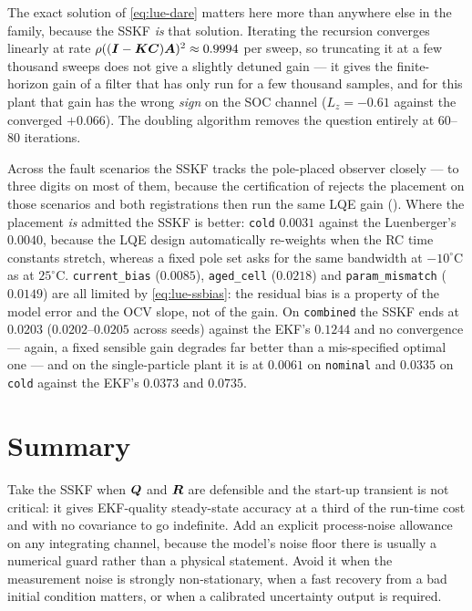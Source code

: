 The exact solution of \eqref{eq:lue-dare} matters here more than anywhere else in the family,
because the SSKF \emph{is} that solution.  Iterating the recursion converges linearly at rate
$\rho((\bm{I}-\bm{K}\bm{C})\bm{A})^2 \approx 0.9994$ per sweep, so truncating it at a few thousand sweeps does
not give a slightly detuned gain --- it gives the finite-horizon gain of a filter that has only
run for a few thousand samples, and for this plant that gain has the wrong \emph{sign} on the SOC
channel ($L_z=-0.61$ against the converged $+0.066$).  The doubling algorithm removes the question
entirely at $60$--$80$ iterations.

Across the fault scenarios the SSKF tracks the pole-placed observer closely --- to three digits
on most of them, because the certification of  rejects the placement on
those scenarios and both registrations then run the same LQE gain ().  Where
the placement \emph{is} admitted the SSKF is better: \texttt{cold} $0.0031$ against the
Luenberger's $0.0040$, because the LQE design automatically re-weights when the RC time constants
stretch, whereas a fixed pole set asks for the same bandwidth at $-10^\circ$C as at
$25^\circ$C.  \texttt{current\_bias} ($0.0085$), \texttt{aged\_cell} ($0.0218$) and
\texttt{param\_mismatch} ($0.0149$) are all limited by \eqref{eq:lue-ssbias}: the residual bias
is a property of the model error and the OCV slope, not of the gain.  On \texttt{combined} the
SSKF ends at $0.0203$ ($0.0202$--$0.0205$ across seeds) against the EKF's $0.1244$ and no
convergence --- again, a fixed sensible gain degrades far better than a mis-specified optimal one
--- and on the single-particle plant it is at $0.0061$ on \texttt{nominal} and $0.0335$ on
\texttt{cold} against the EKF's $0.0373$ and $0.0735$.

\section{Summary}
Take the SSKF when $\bm{Q}$ and $\bm{R}$ are defensible and the start-up transient is not critical: it
gives EKF-quality steady-state accuracy at a third of the run-time cost and with no covariance
to go indefinite.  Add an explicit process-noise allowance on any integrating channel, because
the model's noise floor there is usually a numerical guard rather than a physical statement.
Avoid it when the measurement noise is strongly non-stationary, when a fast recovery from a bad
initial condition matters, or when a calibrated uncertainty output is required.
